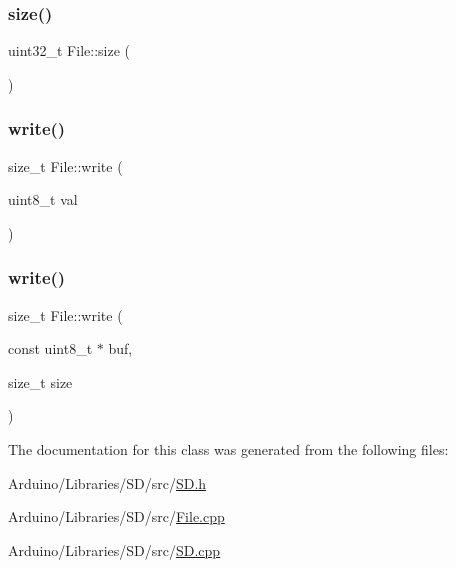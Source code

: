 \subsubsection{\texorpdfstring{size()}{size()}}
{\footnotesize\ttfamily uint32\+\_\+t File\+::size (\begin{DoxyParamCaption}{ }\end{DoxyParamCaption})}

\mbox{\label{class_s_d_lib_1_1_file_acee911dcb9057b964fd5b3ce888a934b}} 
\subsubsection{\texorpdfstring{write()}{write()}\hspace{0.1cm}{\footnotesize\ttfamily [1/2]}}
{\footnotesize\ttfamily size\+\_\+t File\+::write (\begin{DoxyParamCaption}\item[{uint8\+\_\+t}]{val }\end{DoxyParamCaption})\hspace{0.3cm}{\ttfamily [virtual]}}

\mbox{\label{class_s_d_lib_1_1_file_aa531c1641a2363e1f6b9d103f37433da}} 
\subsubsection{\texorpdfstring{write()}{write()}\hspace{0.1cm}{\footnotesize\ttfamily [2/2]}}
{\footnotesize\ttfamily size\+\_\+t File\+::write (\begin{DoxyParamCaption}\item[{const uint8\+\_\+t $\ast$}]{buf,  }\item[{size\+\_\+t}]{size }\end{DoxyParamCaption})\hspace{0.3cm}{\ttfamily [virtual]}}



The documentation for this class was generated from the following files\+:\begin{DoxyCompactItemize}
\item 
Arduino/\+Libraries/\+S\+D/src/\hyperlink{_s_d_8h}{S\+D.\+h}\item 
Arduino/\+Libraries/\+S\+D/src/\hyperlink{_file_8cpp}{File.\+cpp}\item 
Arduino/\+Libraries/\+S\+D/src/\hyperlink{_s_d_8cpp}{S\+D.\+cpp}\end{DoxyCompactItemize}
